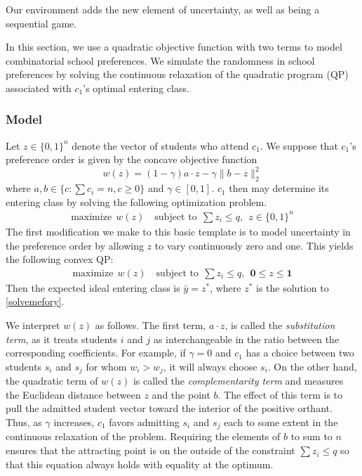 \documentclass[12pt]{article} %
\theoremstyle{definition}
\theoremstyle{definition}
\begin{document}
Our environment adds the new element of uncertainty, as well as being a sequential game. 

In this section, we use a quadratic objective function with two terms to model combinatorial school preferences. We simulate the randomness in school preferences by solving the continuous relaxation of the quadratic program (QP) associated with $c_1$'s optimal entering class.

\subsubsection{Model}
Let $z \in \{0, 1\}^n$ denote the vector of students who attend $c_1$. We suppose that $c_1$'s preference order is given by the concave objective function
\begin{equation} w(z) = (1 -\gamma) a \cdot z - \gamma \| b - z \|_2^2 \end{equation}
where $a, b \in \{c: \sum c_i = n, c \geq 0\}$ and $\gamma \in [0, 1]$. $c_1$ then may determine its entering class by solving the following optimization problem.
\begin{align} \text{maximize}~~w(z) \quad
\text{subject to}~~  \sum z_i \leq q ,~~ z \in \{0, 1\}^n
\end{align}
The first modification we make to this basic template is to model uncertainty in the preference order by allowing $z$ to vary continuously zero and one. This yields the following convex QP:
\begin{align}\label{solvemefory}
\text{maximize}~~  w(z) \quad
\text{subject to}~~  \sum z_i \leq q , ~~\mathbf{0} \leq z \leq \mathbf{1}
\end{align}
Then the expected ideal entering class is $\bar y = z^*$, where $z^*$ is the solution to \eqref{solvemefory}.

We interpret $w(z)$ as follows. The first term, $a \cdot z$, is called the \emph{substitution term}, as it treats students $i$ and $j$ as interchangeable in the ratio between the corresponding coefficients. For example, if $\gamma = 0$ and $c_1$ has a choice between two students $s_i$ and $s_j$ for whom $w_i > w_j$, it will always choose $s_i$. On the other hand, the quadratic term of $w(z)$ is  called the \emph{complementarity term} and measures the Euclidean distance between $z$ and the point $b$. The effect of this term is to pull the admitted student vector toward the interior of the positive orthant. Thus, as $\gamma$ increases, $c_1$ favors admitting $s_i$ and $s_j$ each to some extent in the continuous relaxation of the problem. Requiring the elements of $b$ to sum to $n$ ensures that the attracting point is on the outside of the constraint $\sum z_i \leq q$ so that this equation always holds with equality at the optimum. 
\end{document}
